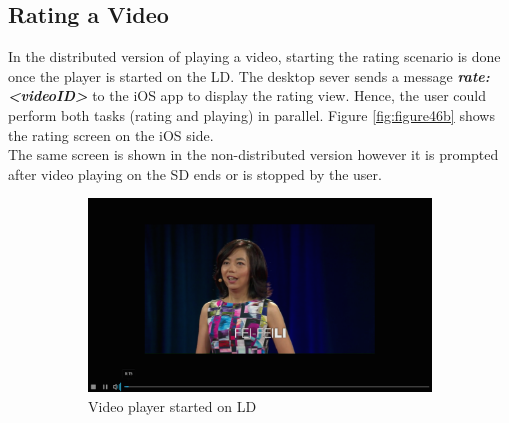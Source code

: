 \subsection{Rating a Video}
In the distributed version of playing a video, starting the rating scenario is done once the player is started on the LD. The desktop sever sends a message \textbf{\textit{rate:<videoID>}} to the iOS app to display the rating view. Hence, the user could perform both tasks (rating and playing) in parallel. Figure \ref{fig:figure46b} shows the rating screen on the iOS side.\\
The same screen is shown in the non-distributed version however it is prompted after video playing on the SD ends or is stopped by the user.
\begin{figure}
    \centering
    \begin{subfigure}[b]{0.6\textwidth}
        \includegraphics[width=\textwidth]{figures/playerLD}
        \caption{Video player started on LD}
        \label{fig:figure46a}
    \end{subfigure}
    ~ %
    \begin{subfigure}[b]{0.3\textwidth}

\end{subfigure}
\end{figure}
